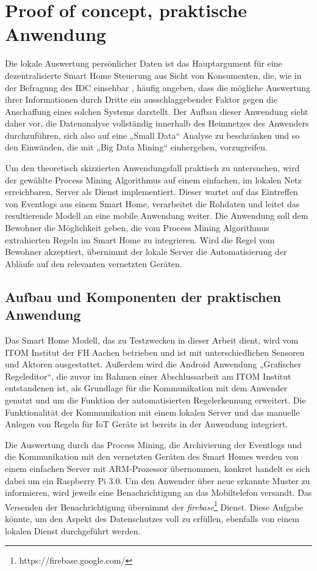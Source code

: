 \chapter{Proof of concept, praktische Anwendung}\label{chap:experiments}
Die lokale Auswertung persönlicher Daten ist das Hauptargument für eine dezentralisierte Smart Home Steuerung aus Sicht von Konsumenten, die, wie in der Befragung des IDC einsehbar \cite{IDC}, häufig angeben, dass die mögliche Auswertung ihrer Informationen durch Dritte ein ausschlaggebender Faktor gegen die Anschaffung eines solchen Systems darstellt. 
Der Aufbau dieser Anwendung sieht daher vor, die Datenanalyse vollständig innerhalb des Heimnetzes des Anwenders durchzuführen, sich also auf eine „Small Data“ Analyse zu beschränken und so den Einwänden, die mit „Big Data Mining“ einhergehen, vorzugreifen. 

Um den theoretisch skizzierten Anwendungsfall praktisch zu untersuchen, wird der gewählte Process Mining Algorithmus auf einem einfachen, im lokalen Netz erreichbaren, Server als Dienst implementiert. Dieser wartet auf das Eintreffen von Eventlogs aus einem Smart Home, verarbeitet die Rohdaten und leitet das resultierende Modell an eine mobile Anwendung weiter. Die Anwendung soll dem Bewohner die Möglichkeit geben, die vom Process Mining Algorithmus extrahierten Regeln im Smart Home zu integrieren. Wird die Regel vom Bewohner akzeptiert, übernimmt der lokale Server die Automatisierung der Abläufe auf den relevanten vernetzten Geräten.

\section{Aufbau und Komponenten der praktischen Anwendung}
Das Smart Home Modell, das zu Testzwecken in dieser Arbeit dient, wird vom ITOM Institut der FH Aachen betrieben und ist mit unterschiedlichen Sensoren und Aktoren ausgestattet. 
Außerdem wird die Android Anwendung „Grafischer Regeleditor“, die zuvor im Rahmen einer Abschlussarbeit am ITOM Institut entstandenen ist, als Grundlage für die Kommunikation mit dem Anwender genutzt und um die Funktion der automatisierten Regelerkennung erweitert. 
Die Funktionalität der Kommunikation mit einem lokalen Server und das manuelle Anlegen von Regeln für IoT Geräte ist bereits in der Anwendung integriert.

Die Auswertung durch das Process Mining, die Archivierung der Eventlogs und die Kommunikation mit den vernetzten Geräten des Smart Homes werden von einem einfachen Server mit ARM-Prozessor übernommen, konkret handelt es sich dabei um ein Raspberry Pi 3.0. Um den Anwender über neue erkannte Muster zu informieren, wird jeweils eine Benachrichtigung an das Mobiltelefon versandt. Das Versenden der Benachrichtigung übernimmt der \textit{firebase}\footnote{https://firebase.google.com/} Dienst. Diese Aufgabe könnte, um den Aspekt des Datenschutzes voll zu erfüllen, ebenfalls von einem lokalen Dienst durchgeführt werden.

